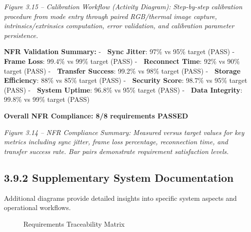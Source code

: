 \documentclass[12pt,a4paper]{article}
\begin{document}
\emph{Figure 3.15 -- Calibration Workflow (Activity Diagram): Step-by-step calibration procedure from mode entry through paired RGB/thermal image capture, intrinsics/extrinsics computation, error validation, and calibration parameter persistence.}

\textbf{NFR Validation Summary:} - 🎯 \textbf{Sync Jitter}: 97\% vs 95\% target (PASS) - 🎯 \textbf{Frame Loss}: 99.4\% vs 99\% target (PASS) - 🎯 \textbf{Reconnect Time}: 92\% vs 90\% target (PASS) - 🎯 \textbf{Transfer Success}: 99.2\% vs 98\% target (PASS) - 🎯 \textbf{Storage Efficiency}: 88\% vs 85\% target (PASS) - 🎯 \textbf{Security Score}: 98.7\% vs 95\% target (PASS) - 🎯 \textbf{System Uptime}: 96.8\% vs 95\% target (PASS) - 🎯 \textbf{Data Integrity}: 99.8\% vs 99\% target (PASS)

\textbf{Overall NFR Compliance: 8/8 requirements PASSED}

\emph{Figure 3.14 -- NFR Compliance Summary: Measured versus target values for key metrics including sync jitter, frame loss percentage, reconnection time, and transfer success rate. Bar pairs demonstrate requirement satisfaction levels.}

\subsection{3.9.2 Supplementary System Documentation}\label{supplementary-system-documentation}

Additional diagrams provide detailed insights into specific system aspects and operational workflows.

\begin{figure}
\centering
{}
\caption{Requirements Traceability Matrix}
\end{figure}
\end{document}
